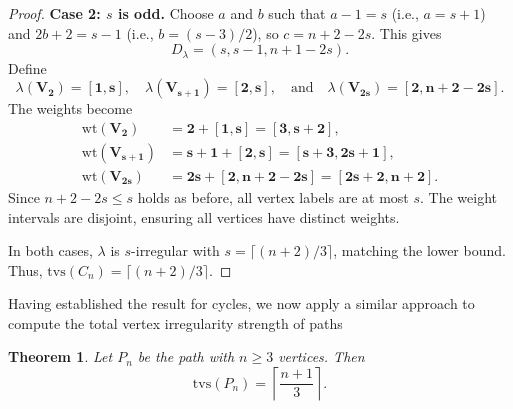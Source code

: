 \documentclass[11pt]{article}
\newtheorem{thm}{Theorem}[section]
\numberwithin{equation}{section}
\begin{document}
\begin{proof}
\textbf{Case 2: \(s\) is odd.} Choose \(a\) and \(b\) such that \(a - 1 = s\) (i.e., \(a = s + 1\)) and \(2b + 2 = s - 1\) (i.e., \(b = (s - 3)/2\)), so \(c = n + 2 - 2s\). This gives
\[
D_{\lambda} = (s, s - 1, n + 1 - 2s).
\]
Define
\begin{equation}\label{s_odd}
\lambda(\mathbf{V_2}) = \mathbf{[1,s]}, \quad \lambda(\mathbf{V_{s+1}}) = \mathbf{[2,s]}, \quad \text{and} \quad \lambda(\mathbf{V_{2s}}) = \mathbf{[2,n+2-2s]}.
\end{equation}
The weights become
\begin{align*}
\mathrm{wt}(\mathbf{V_2}) &= \mathbf{2} + \mathbf{[1,s]} = \mathbf{[3,s+2]}, \\
\mathrm{wt}(\mathbf{V_{s+1}}) &= \mathbf{s + 1} + \mathbf{[2,s]} = \mathbf{[s+3,2s+1]}, \\
\mathrm{wt}(\mathbf{V_{2s}}) &= \mathbf{2s} + \mathbf{[2,n+2-2s]} = \mathbf{[2s+2,n+2]}.
\end{align*}
Since \(n + 2 - 2s \leq s\) holds as before, all vertex labels are at most \(s\). The weight intervals are disjoint, ensuring all vertices have distinct weights.

In both cases, \(\lambda\) is \(s\)-irregular with \(s = \lceil (n + 2) / 3 \rceil\), matching the lower bound. Thus, \(\mathrm{tvs}(C_n) = \lceil (n + 2) / 3 \rceil\).
\end{proof}
Having established the result for cycles, we now apply a similar approach to compute the total vertex irregularity strength of paths
\begin{thm}
Let \(P_n\) be the path with \(n\geq 3\) vertices. Then
\[
\mathrm{tvs}(P_n) = \left\lceil \frac{n+1}{3} \right\rceil.
\]
\end{thm}
\end{document}
